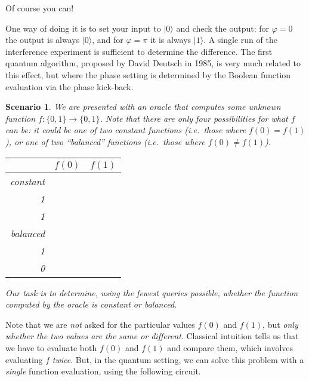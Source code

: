 \documentclass[fleqn]{article}
\newtheorem*{scenario}{Scenario}
\begin{document}
Of course you can!

One way of doing it is to set your input to \(|0\rangle\) and check the output: for \(\varphi=0\) the output is always \(|0\rangle\), and for \(\varphi=\pi\) it is always \(|1\rangle\).
A single run of the interference experiment is sufficient to determine the difference.
The first quantum algorithm, proposed by David Deutsch in 1985, is very much related to this effect, but where the phase setting is determined by the Boolean function evaluation via the phase kick-back.

\begin{scenario}
We are presented with an oracle that computes some unknown function \(f\colon\{0,1\}\to\{0,1\}\).
Note that there are only four possibilities for what \(f\) can be: it could be one of two constant functions (i.e.~those where \(f(0)=f(1)\)), or one of two ``balanced'' functions (i.e.~those where \(f(0)\neq f(1)\)).

\begin{longtable}[]{@{}rcc@{}}
\toprule
& \(f(0)\) & \(f(1)\)\tabularnewline
\midrule
\endhead
constant & \(\begin{matrix}0\\1\end{matrix}\) & \(\begin{matrix}0\\1\end{matrix}\)\tabularnewline
balanced & \(\begin{matrix}0\\1\end{matrix}\) & \(\begin{matrix}1\\0\end{matrix}\)\tabularnewline
\bottomrule
\end{longtable}

Our task is to determine, using the fewest queries possible, whether the function computed by the oracle is constant or balanced.

\end{scenario}

Note that we are \emph{not} asked for the particular values \(f(0)\) and \(f(1)\), but \emph{only whether the two values are the same or different}.
Classical intuition tells us that we have to evaluate both \(f(0)\) and \(f(1)\) and compare them, which involves evaluating \(f\) \emph{twice}.
But, in the quantum setting, we can solve this problem with a \emph{single} function evaluation, using the following circuit.
\end{document}
